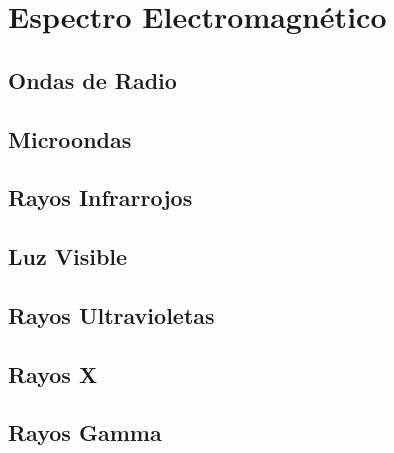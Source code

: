\chapter{Espectro Electromagnético}\label{lbl-espectroElectromagnetico}

\section{Ondas de Radio}

\section{Microondas}

\section{Rayos Infrarrojos}

\section{Luz Visible}

\section{Rayos Ultravioletas}

\section{Rayos X}

\section{Rayos Gamma}

